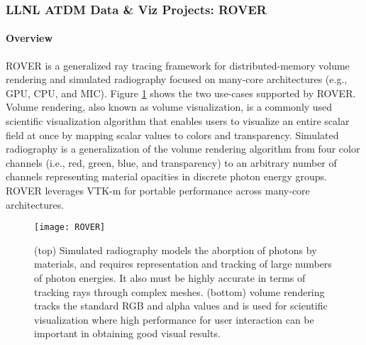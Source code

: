 \subsubsection{LLNL ATDM Data \& Viz Projects: ROVER}


\paragraph{Overview} 

ROVER is a generalized ray tracing framework for distributed-memory volume
rendering and simulated radiography \cite{rover-laney} focused on many-core architectures (e.g.,
GPU, CPU, and MIC).  Figure \ref{fig:rover-overview} shows the two use-cases
supported by ROVER. Volume rendering, also known as volume visualization, is a
commonly used scientific visualization algorithm that enables users to
visualize an entire scalar field at once by mapping scalar values to colors and
transparency.  Simulated radiography is a generalization of the volume
rendering algorithm from four color channels (i.e., red, green, blue, and
transparency) to an arbitrary number of channels representing material
opacities in discrete photon energy groups. ROVER leverages VTK-m
\cite{rover-vtkm} for portable performance across many-core architectures. 
\begin{figure}[htb]
	\centering
	\texttt{[image: ROVER]}
	\caption{\label{fig:rover-overview} (top) Simulated radiography models
the aborption of photons by materials, and requires representation and tracking
of large numbers of photon energies. It also must be highly accurate in terms
of tracking rays through complex meshes. (bottom) volume rendering tracks the
standard RGB and alpha values and is used for scientific visualization where
high performance for user interaction can be important in obtaining good visual
results.} \end{figure}


